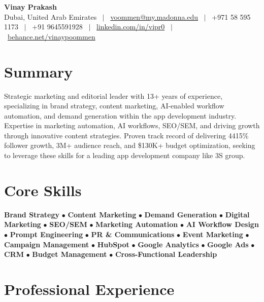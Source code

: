 \documentclass[10.5pt,a4paper]{article}
\begin{document}
\begin{center}
{\LARGE\bfseries Vinay Prakash}\\[0.3em]
\small Dubai, United Arab Emirates \ $|$ \ 
\href{mailto:voommen@my.madonna.edu}{voommen@my.madonna.edu} \ $|$ \ 
+971 58 595 1173 \ $|$ \ 
+91 9645591928 \ $|$ \ 
\href{https://linkedin.com/in/vipr0}{linkedin.com/in/vipr0} \ $|$ \ 
\href{https://behance.net/vinaypoommen}{behance.net/vinaypoommen}
\end{center}
\vspace{-6pt}

\section{Summary}
\small{Strategic marketing and editorial leader with 13+ years of experience, specializing in brand strategy, content marketing, AI-enabled workflow automation, and demand generation within the app development industry. Expertise in marketing automation, AI workflows, SEO/SEM, and driving growth through innovative content strategies. Proven track record of delivering 4415\% follower growth, 3M+ audience reach, and \$130K+ budget optimization, seeking to leverage these skills for a leading app development company like 3S group.}

\section{Core Skills}
\small{\textbf{Brand Strategy} $\bullet$ \textbf{Content Marketing} $\bullet$ \textbf{Demand Generation} $\bullet$ \textbf{Digital Marketing} $\bullet$ \textbf{SEO/SEM} $\bullet$ \textbf{Marketing Automation} $\bullet$ \textbf{AI Workflow Design} $\bullet$ \textbf{Prompt Engineering} $\bullet$ \textbf{PR \& Communications} $\bullet$ \textbf{Event Marketing} $\bullet$ \textbf{Campaign Management} $\bullet$ \textbf{HubSpot} $\bullet$ \textbf{Google Analytics} $\bullet$ \textbf{Google Ads} $\bullet$ \textbf{CRM} $\bullet$ \textbf{Budget Management} $\bullet$ \textbf{Cross-Functional Leadership}}

\section{Professional Experience}
\end{document}
